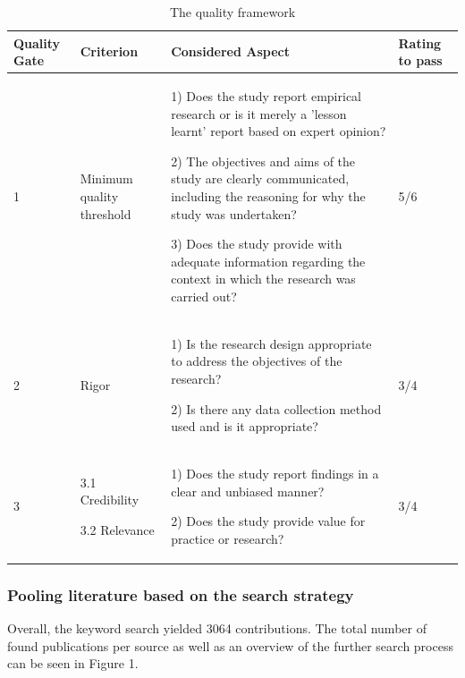 \documentclass{bmcart}
\begin{document}
\begin{table}[h]
  \renewcommand{\arraystretch}{1.5}
  \caption[]{The quality framework}
  \begin{tabular}{|p{0.7cm}|p{2cm}|p{6cm}|p{1.5cm}|}
      \hline
      Quality Gate & Criterion & Considered Aspect & Rating to pass \\ 

      \hline

      1 & Minimum quality threshold & 
      
      1) Does the study report empirical research or is it merely a 'lesson learnt' report based on expert opinion?

      2) The objectives and aims of the study are clearly communicated, including the reasoning for why the study was undertaken?

      3) Does the study provide with adequate information regarding the context in which the research was carried out?
      & 5/6 \\ 
      \hline
      2 & Rigor & 
      
      1) Is the research design appropriate to address the objectives of the research?

      2) Is there any data collection method used and is it appropriate?
      & 3/4 \\ 
      \hline  
      3 &
      3.1 Credibility 

      3.2 Relevance 
      & 
      1) Does the study report findings in a clear and unbiased manner?

      2) Does the study provide value for practice or research?
      & 
      3/4 \\ 
      \hline   
  \end{tabular}
  \label{qualityFramework}
\end{table}


\subsubsection{Pooling literature based on the search strategy}
Overall, the keyword search yielded 3064 contributions. The total number of found publications per source as well as an overview of the further search process can be seen in Figure 1.
\end{document}
